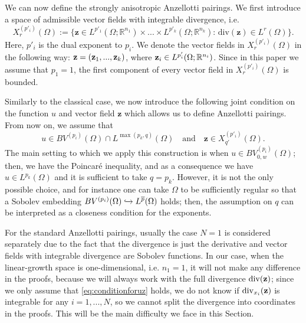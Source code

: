 \documentclass[reqno,12pt]{amsart}
\def\z{{\bf z}}
\def\R{\mathbb R}
\numberwithin{equation}{section}
\begin{document}
We can now define the strongly anisotropic Anzellotti pairings. We first introduce a space of admissible vector fields with integrable divergence, i.e.
\begin{equation}
X^{(p'_i)}_r(\Omega) := \bigg\{ \mathbf{z} \in L^{p'_1}(\Omega; \R^{n_1}) \times ... \times L^{p'_k}(\Omega; \R^{n_k}): \, \mathrm{div}(\mathbf{z}) \in L^r(\Omega) \bigg\}.
\end{equation}
Here, $p'_i$ is the dual exponent to $p_i$. We denote the vector fields in $X^{(p'_i)}_r(\Omega)$ in the following way: $\z = (\z_1, ..., \z_k)$, where $\z_i \in L^{p'_i}(\Omega; \R^{n_i})$. Since in this paper we assume that $p_1 = 1$, the first component of every vector field in $X^{(p'_i)}_r(\Omega)$ is bounded.

Similarly to the classical case, we now introduce the following joint condition on the function $u$ and vector field $\mathbf{z}$ which allows us to define Anzellotti pairings. From now on, we assume that
\begin{equation}\label{eq:conditionforuz}
u \in BV^{(p_i)}(\Omega) \cap L^{\max(p_k,q)}(\Omega) \quad \mbox{and} \quad \mathbf{z} \in X^{(p'_i)}_{q'}(\Omega).
\end{equation}
The main setting to which we apply this construction is when $u \in BV_{0,w}^{(p_i)}(\Omega)$; then, we have the Poincar\'e inequality, and as a consequence we have $u \in L^{p_k}(\Omega)$ and it is sufficient to take $q = p_k$. However, it is not the only possible choice, and for instance one can take $\Omega$ to be sufficiently regular so that a Sobolev embedding $BV^{(p_i)}(\Omega) \xhookrightarrow{} L^{\overline{p}}(\Omega)$ holds; then, the assumption on $q$ can be interpreted as a closeness condition for the exponents.

For the standard Anzellotti pairings, usually the case $N = 1$ is considered separately due to the fact that the divergence is just the derivative and vector fields with integrable divergence are Sobolev functions. In our case, when the linear-growth space is one-dimensional, i.e. $n_1 = 1$, it will not make any difference in the proofs, because we will always work with the full divergence $\mathrm{div}(\z)$; since we only assume that \eqref{eq:conditionforuz} holds, we do not know if $\mathrm{div}_{x_i}(\z)$ is integrable for any $i = 1, ..., N$, so we cannot split the divergence into coordinates in the proofs. This will be the main difficulty we face in this Section.
\end{document}
